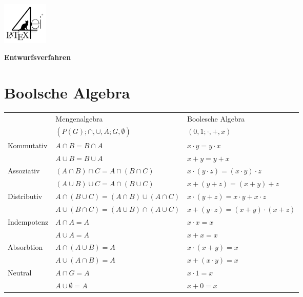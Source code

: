\documentclass[6pt,a4paper]{scrartcl}
\renewcommand{\emph}[1]{\textsf{\textbf{#1}}}
\begin{document}
\newpage
\begin{multicols}{3}

\parbox{2.3cm}{
	\includegraphics[height=2cm]{./img/Logo.pdf}
}
\parbox{4cm}{
	\emph{\huge{Entwurfsverfahren}}
}

\setcounter{section}{0}			%

\section{Boolsche Algebra}
	\begin{tabular}{l|l|l}
		& Mengenalgebra & Boolesche Algebra \\ 
		& $(P(G);\cap , \cup, \overline{A};G,\emptyset )$ & $({0,1};\cdot , +, \overline{x})$ \\ \midrule
		Kommutativ 		& $A \cap B = B \cap A$ & $x \cdot y = y \cdot x$  \\ 
						& $A \cup B = B \cup A$ & $x + y = y + x$\\
		Assoziativ 		& $(A \cap B) \cap C = A \cap (B \cap C)$ & $x \cdot (y \cdot z) = (x \cdot y) \cdot z$\\
						& $(A \cup B) \cup C = A \cap (B \cup C)$ & $x + (y + z) = (x + y) + z$\\
		Distributiv 	& $A \cap (B \cup C) = (A \cap B) \cup (A \cap C)$ & $x \cdot (y + z) = x \cdot y + x \cdot z$\\
						& $A \cup (B \cap C) = (A \cup B) \cap (A \cup C)$ & $x + (y \cdot z) = (x + y) \cdot (x + z)$\\
		Indempotenz		& $A \cap A = A$ & $x \cdot x = x$ \\
						& $A \cup A = A$ & $x + x = x$\\
		Absorbtion		& $A \cap (A \cup B) = A$ & $x \cdot (x+y) = x$ \\
						& $A \cup (A \cap B) = A$ & $x + (x \cdot y) = x$ \\
		Neutral			& $A \cap G = A$ & $x \cdot 1 = x$ \\
						& $A \cup \emptyset = A$ & $x + 0 = x$ \\

\end{tabular}
\end{multicols}
\end{document}

